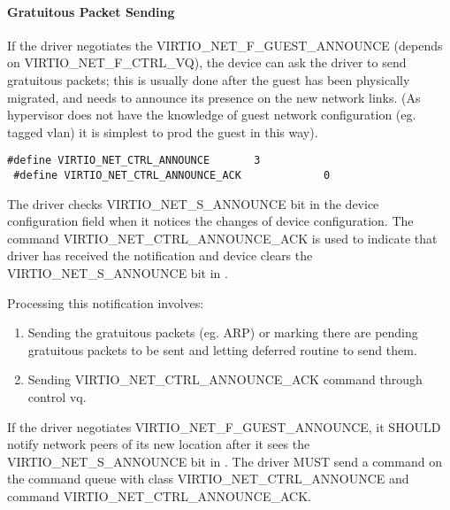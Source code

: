\paragraph{Gratuitous Packet Sending}\label{sec:Device Types / Network Device / Device Operation / Control Virtqueue / Gratuitous Packet Sending}

If the driver negotiates the VIRTIO_NET_F_GUEST_ANNOUNCE (depends
on VIRTIO_NET_F_CTRL_VQ), the device can ask the driver to send gratuitous
packets; this is usually done after the guest has been physically
migrated, and needs to announce its presence on the new network
links. (As hypervisor does not have the knowledge of guest
network configuration (eg. tagged vlan) it is simplest to prod
the guest in this way).

\begin{lstlisting}
#define VIRTIO_NET_CTRL_ANNOUNCE       3
 #define VIRTIO_NET_CTRL_ANNOUNCE_ACK             0
\end{lstlisting}

The driver checks VIRTIO_NET_S_ANNOUNCE bit in the device configuration  field
when it notices the changes of device configuration. The
command VIRTIO_NET_CTRL_ANNOUNCE_ACK is used to indicate that
driver has received the notification and device clears the
VIRTIO_NET_S_ANNOUNCE bit in .

Processing this notification involves:

\begin{enumerate}
\item Sending the gratuitous packets (eg. ARP) or marking there are pending
  gratuitous packets to be sent and letting deferred routine to
  send them.

\item Sending VIRTIO_NET_CTRL_ANNOUNCE_ACK command through control
  vq.
\end{enumerate}


If the driver negotiates VIRTIO_NET_F_GUEST_ANNOUNCE, it SHOULD notify
network peers of its new location after it sees the VIRTIO_NET_S_ANNOUNCE bit
in .  The driver MUST send a command on the command queue
with class VIRTIO_NET_CTRL_ANNOUNCE and command VIRTIO_NET_CTRL_ANNOUNCE_ACK.


